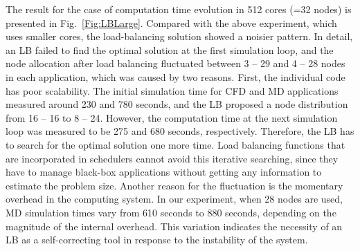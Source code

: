 \documentclass[preprint,12pt]{elsarticle}
\begin{document}

The result for the case of computation time evolution in 512 cores (=32 nodes) is presented in Fig.~\ref{Fig:LBLarge}. Compared with the above experiment, which uses smaller cores, the load-balancing solution showed a noisier pattern. In detail, an LB failed to find the optimal solution at the first simulation loop, and the node allocation after load balancing fluctuated between 3 -- 29 and 4 -- 28 nodes in each application, which was caused by two reasons. First, the individual code has poor scalability. The initial simulation time for CFD and MD applications measured around 230 and 780 seconds, and the LB proposed a node distribution from 16 -- 16 to 8 -- 24. However, the computation time at the next simulation loop was measured to be 275 and 680 seconds, respectively. Therefore, the LB has to search for the optimal solution one more time. Load balancing functions that are incorporated in schedulers cannot avoid this iterative searching, since they have to manage black-box applications without getting any information to estimate the problem size. Another reason for the fluctuation is the momentary overhead in the computing system. In our experiment, when 28 nodes are used, MD simulation times vary from 610 seconds to 880 seconds, depending on the magnitude of the internal overhead. This variation indicates the necessity of an LB as a self-correcting tool in response to the instability of the system.
\end{document}
